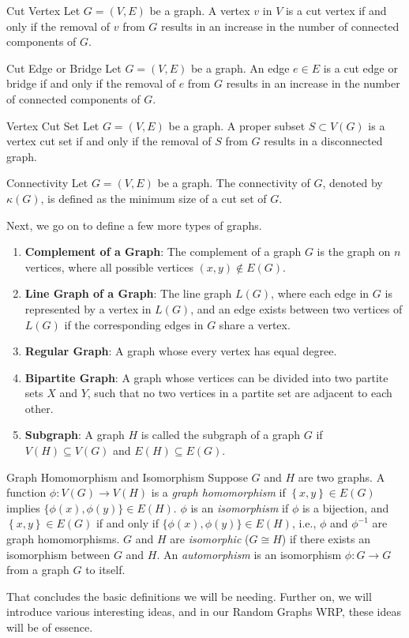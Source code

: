 \documentclass[../basic_graph_theory.tex]{subfiles}
\begin{document}
\begin{Def}{Cut Vertex}{}
  Let \( G = (V, E) \) be a graph. A vertex \( v \) in \( V \) is a cut vertex if and only if the removal of \( v \) from \( G \) results in an increase in the number of connected components of \( G \).
\end{Def}

\begin{Def}{Cut Edge or Bridge}{}
  Let \( G = (V, E) \) be a graph. An edge \( e \in E \) is a cut edge or bridge if and only if the removal of \( e \) from \( G \) results in an increase in the number of connected components of \( G \).
\end{Def}

\begin{Def}{Vertex Cut Set}{}
  Let \( G = (V, E) \) be a graph. A proper subset \( S \subset V(G) \) is a vertex cut set if and only if the removal of \( S \) from \( G \) results in a disconnected graph.
\end{Def}

\begin{Def}{Connectivity}{}
  Let \( G = (V, E) \) be a graph. The connectivity of \( G \), denoted by \( \kappa(G) \), is defined as the minimum size of a cut set of \( G \).
\end{Def}

Next, we go on to define a few more types of graphs.

\begin{enumerate}
  \item \textbf{Complement of a Graph}: The complement of a graph $G$ is the graph on $n$ vertices, where all possible vertices $(x,y) \notin E(G)$.
  \item \textbf{Line Graph of a Graph}: The line graph $L(G)$, where each edge in $G$ is represented by a vertex in $L(G)$, and an edge exists between two vertices of $L(G)$ if the corresponding edges in $G$ share a vertex.
  \item \textbf{Regular Graph}: A graph whose every vertex has equal degree.
  \item \textbf{Bipartite Graph}: A graph whose vertices can be divided into two partite sets $X$ and $Y$, such that no two vertices in a partite set are adjacent to each other.
  \item \textbf{Subgraph}: A graph $H$ is called the subgraph of a graph $G$ if $V(H) \subseteq V(G)$ and $E(H) \subseteq E(G)$.
\end{enumerate}

\begin{Def}{Graph Homomorphism and Isomorphism}{}
  Suppose $G$ and $H$ are two graphs. A function $\phi : V(G) \to V(H)$ is a \textit{graph homomorphism} if $\left\{ x, y \right\} \in E(G)$ implies $\{\phi(x), \phi(y)\} \in E(H)$. $\phi$ is an \textit{isomorphism} if $\phi$ is a bijection, and $\left\{ x, y \right\} \in E(G)$ if and only if $\{\phi(x), \phi(y)\} \in E(H)$, i.e., $\phi$ and $\phi^{-1}$ are graph homomorphisms. $G$ and $H$ are \textit{isomorphic} ($G \cong H$) if there exists an isomorphism between $G$ and $H$. An \textit{automorphism} is an isomorphism $\phi : G \to G$ from a graph $ G $ to itself.
\end{Def}

That concludes the basic definitions we will be needing. Further on, we will introduce various interesting ideas, and in our Random Graphs WRP, these ideas will be of essence.
\end{document}
